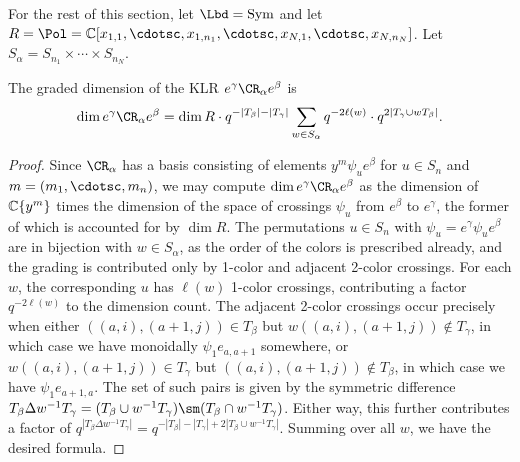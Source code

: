 \documentclass[11pt,reqno]{amsart}
\begin{document}
For the rest of this section, let $\Lbd=\Sym$ and let $R=\Pol=\BC[x_{1,1},\cdotsc,x_{1,n_1},\cdotsc,x_{N,1},\cdotsc,x_{N,n_N}]$. Let $S_\alpha=S_{n_1}\times\cdots\times S_{n_N}$. 
\begin{lemma}\label{lem:dimklr}
    The graded dimension of the KLR $e^\gamma \CR_\alpha e^\beta$ is
    \[\dim e^\gamma \CR_\alpha e^\beta = \dim R\cdot q^{-|T_\beta|-|T_\gamma|}\sum_{w\in S_\alpha} q^{-2\ell(w)}\cdot q^{2|T_\gamma\cup w T_\beta|}.\]
\end{lemma}
\begin{proof}
    Since $\CR_\alpha$ has a basis consisting of elements $y^m\psi_u e^\beta$ for $u\in S_n$ and $m=(m_1,\cdotsc,m_n)$, we may compute $\dim e^\gamma \CR_\alpha e^\beta$ as the dimension of $\mathbb C\{y^m\}$ times the dimension of the space of crossings $\psi_u$ from $e^\beta$ to $e^\gamma$, the former of which is accounted for by $\dim R$. The permutations $u\in S_n$ with $\psi_u=e^\gamma \psi_u e^\beta$ are in bijection with $w\in S_\alpha$, as the order of the colors is prescribed already, and the grading is contributed only by 1-color and adjacent 2-color crossings. For each $w$, the corresponding $u$ has $\ell(w)$ 1-color crossings, contributing a factor $q^{-2\ell(w)}$ to the dimension count. The adjacent 2-color crossings occur precisely when either $((a,i),(a+1,j))\in T_\beta$ but $w((a,i),(a+1,j))\not\in T_\gamma$, in which case we have monoidally $\psi_1 e_{a,a+1}$ somewhere, or $w((a,i),(a+1,j))\in T_\gamma$ but $((a,i),(a+1,j))\not\in T_\beta$, in which case we have $\psi_1 e_{a+1,a}$. The set of such pairs is given by the symmetric difference $T_\beta\Delta w^{-1} T_\gamma=(T_\beta\cup w^{-1} T_\gamma)\sm (T_\beta\cap w^{-1} T_\gamma)$. Either way, this further contributes a factor of $q^{|T_\beta\Delta w^{-1} T_\gamma|}=q^{-|T_\beta|-|T_\gamma|+2|T_\beta\cup w^{-1} T_\gamma|}$. Summing over all $w$, we have the desired formula.
\end{proof}
\end{document}
